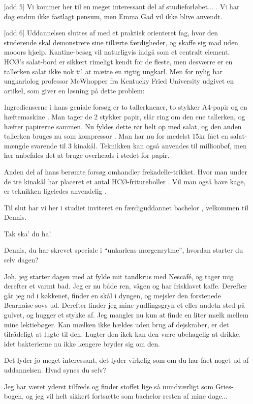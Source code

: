 \documentclass[a4paper,11pt]{article}
\begin{document}
\begin{sketch}
  [add 5] Vi kommer her til en meget interessant del af
  studieforløbet... .  Vi har dog
  endnu ikke fastlagt pensum, men Emma Gad vil ikke blive anvendt.

  [add 6] Uddannelsen sluttes af med et praktisk orienteret
  fag, hvor den studerende skal demonstrere sine tillærte færdigheder,
  og skaffe sig mad uden mooors hjælp.  Kantine-besøg vil naturligvis
  indgå som et centralt element.  HCØ's salat-bord er sikkert rimeligt
  kendt for de fleste, men desværre er en tallerken salat ikke nok til
  at mætte en rigtig ungkarl.  Men for nylig har ungkarlolog professor
  McWhopper fra Kentucky Fried University udgivet en artikel, som
  giver en løsning på dette problem:

  Ingredienserne i hans geniale forsøg er to tallerknener, to stykker
  A4-papir og en hæftemaskine .  Man tager de 2 stykker
  papir, slår ring om den ene tallerken, og hæfter papirerne sammen.
  Nu fyldes dette rør helt op med salat, og den anden tallerken bruges
  nu som kompressor .  Man har nu for
  medelst 15kr fået en salat-mængde svarende til 3 kinakål.  Teknikken
  kan også anvendes til millionbøf, men her anbefales det at bruge
  overheads i stedet for papir.

  Anden del af hans berømte forsøg omhandler frekadelle-trikket.  Hvor
  man under de tre kinakål har placeret et antal HCØ-fritureboller
  .  Vil man også
  have kage, er teknikken ligeledes anvendelig .

  Til slut har vi her i studiet inviteret en færdiguddannet bachelor
  , velkommen til Dennis.

   Tak ska' du ha'.

   Dennis, du har skrevet speciale i "`unkarlens
  morgenrytme"', hvordan starter du selv dagen?

   Joh, jeg starter dagen med at fylde mit tandkrus med
  Nescafé, og tager mig derefter et varmt bad.  Jeg er nu både ren,
  vågen og har frisklavet kaffe.  Derefter går jeg ud i køkkenet,
  finder en skål i dyngen, og mejsler den forstenede Bearnaise-sovs
  ud.  Derefter finder jeg mine yndlingsgryn et eller andetn sted på
  gulvet, og hugger et stykke af.  Jeg mangler nu kun at finde en
  liter mælk mellem mine lektiebøger.  Kan mælken ikke hældes uden
  brug af dejskraber, er det tilrådeligt at lugte til den.  Lugter den
  ikek kan den være ubehagelig at drikke, idet bakterierne nu ikke
  længere bryder sig om den.

   Det lyder jo meget interessant, det lyder virkelig som om
  du har fået noget ud af uddannelsen.  Hvad synes du selv?

   Jeg har været yderst tilfreds og finder stoffet lige så
  uundværligt som Gries-bogen, og jeg vil helt sikkert fortsætte som
  bachelor resten af mine dage...


\end{sketch}
\end{document}
